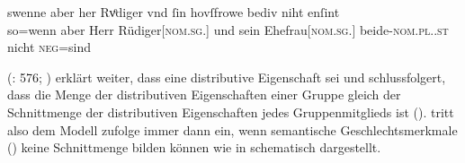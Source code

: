 \begin{exe}
\ex \label{ex:gendres2}
		\gll swenne aber her Rvͦdiger vnd ſin
			hovſfrowe bediv niht enſint \\
		so=wenn aber Herr Rüdiger[\textsc{nom.sg.\MascM}] und sein
			Ehefrau[\textsc{nom.sg.\FemF}] beide-\textsc{nom.pl.\NeutMF.st}
			nicht \textsc{neg}=sind \\
		\trans {}
			\parencites(Nr.~3262, Regensburg, 1299)[425,13--14]{cao4}
\end{exe}

\citeauthor{wechsler2009} (\citeyear{wechsler2009}: 576;
\cite[vgl.~auch][182]{wechslerzlatic2003}) erklärt weiter, dass 
eine distributive Eigenschaft sei und schlussfolgert, dass die Menge der
distributiven Eigenschaften einer Gruppe gleich der Schnittmenge der
distributiven Eigenschaften jedes Gruppenmitglieds ist
().
%
%
 tritt also dem Modell zufolge immer dann ein, wenn
semantische Geschlechtsmerkmale
() keine Schnittmenge bilden können wie in 
schematisch dargestellt.

